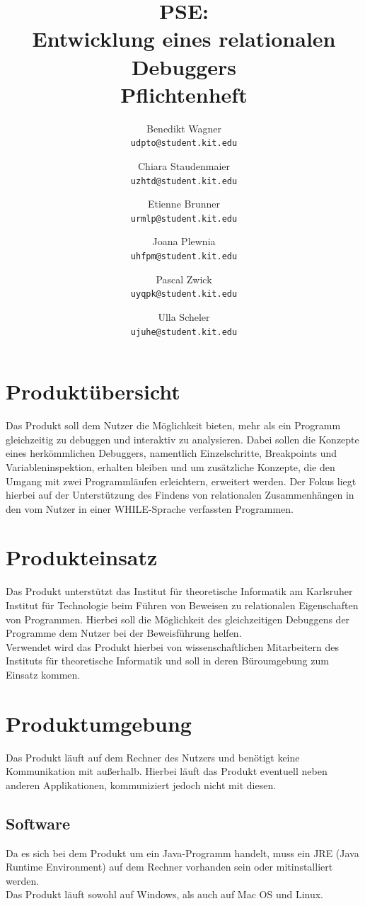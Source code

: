 \documentclass[parskip=full]{scrartcl}
\title{PSE:\\ Entwicklung eines relationalen Debuggers\\ Pflichtenheft}
\author{
	Benedikt Wagner\\
	\texttt{udpto@student.kit.edu}
	\and Chiara Staudenmaier\\
	\texttt{uzhtd@student.kit.edu}
	\and Etienne Brunner\\
	\texttt{urmlp@student.kit.edu}
	\and Joana Plewnia\\
	\texttt{uhfpm@student.kit.edu} 
	\and Pascal Zwick\\
	\texttt{uyqpk@student.kit.edu}
	\and Ulla Scheler\\
	\texttt{ujuhe@student.kit.edu}
}
\begin{document}
\maketitle
\newpage

\tableofcontents
\newpage

\section{Produktübersicht}
Das Produkt soll dem Nutzer die Möglichkeit bieten, mehr als ein Programm gleichzeitig zu debuggen und interaktiv zu analysieren. Dabei sollen die Konzepte eines herkömmlichen Debuggers, namentlich Einzelschritte, Breakpoints und Variableninspektion, erhalten bleiben und um zusätzliche Konzepte, die den Umgang mit zwei Programmläufen erleichtern, erweitert werden. Der Fokus liegt hierbei auf der Unterstützung des Findens von relationalen Zusammenhängen in den vom Nutzer in einer WHILE-Sprache verfassten Programmen.


\section{Produkteinsatz}
Das Produkt unterstützt das Institut für theoretische Informatik am Karlsruher Institut für Technologie beim Führen von Beweisen zu relationalen Eigenschaften von Programmen. Hierbei soll die Möglichkeit des gleichzeitigen Debuggens der Programme dem Nutzer bei der Beweisführung helfen. \\
Verwendet wird das Produkt hierbei von wissenschaftlichen Mitarbeitern des Instituts für theoretische Informatik und soll in deren Büroumgebung zum Einsatz kommen.



\section{Produktumgebung}
Das Produkt läuft auf dem Rechner des Nutzers und benötigt keine Kommunikation mit außerhalb. Hierbei läuft das Produkt eventuell neben anderen Applikationen, kommuniziert jedoch nicht mit diesen.

\subsection{Software}
Da es sich bei dem Produkt um ein Java-Programm handelt, muss ein JRE (Java Runtime Environment) auf dem Rechner vorhanden sein oder mitinstalliert werden. \\
Das Produkt läuft sowohl auf Windows, als auch auf Mac OS und Linux.
\end{document}
